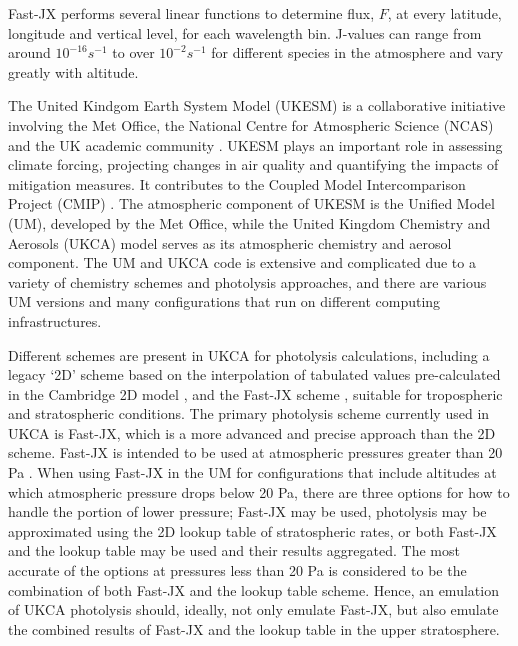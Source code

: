 \documentclass[journal abbreviation, manuscript]{copernicus}
\begin{document}
Fast-JX performs several linear functions to determine flux, $F$, at every latitude, longitude and vertical level, for each wavelength bin.
J-values can range from around $10^{-16} s^{-1}$ to over $10^{-2} s^{-1}$ for different species in the atmosphere and vary greatly with altitude.

The United Kindgom Earth System Model (UKESM) is a collaborative initiative involving the Met Office, the National Centre for Atmospheric Science (NCAS) and the UK academic community \citep{sellar_ukesm1_2019}. UKESM plays an important role in assessing climate forcing, projecting changes in air quality and quantifying the impacts of mitigation measures. It contributes to the Coupled Model Intercomparison Project (CMIP) \citep{eyring_overview_2016}. The atmospheric component of UKESM is the Unified Model (UM), developed by the Met Office, while the United Kingdom Chemistry and Aerosols (UKCA) model \citep{archibald_description_2020} serves as its atmospheric chemistry and aerosol component. The UM and UKCA code is extensive and complicated due to a variety of chemistry schemes and photolysis approaches, and there are various UM versions and many configurations that run on different computing infrastructures.

Different schemes are present in UKCA for photolysis calculations, including a legacy `2D' scheme based on the interpolation of tabulated values pre-calculated in the Cambridge 2D model \citep{abraham_united_2014}, and the Fast-JX scheme \citep{telford_implementation_2013}, suitable for tropospheric and stratospheric conditions. The primary photolysis scheme currently used in UKCA is Fast-JX, which is a more advanced and precise approach than the 2D scheme. %
Fast-JX is intended to be used at atmospheric pressures greater than 20 Pa \citep{wild_fast-j_2000}. When using Fast-JX in the UM for configurations that include altitudes at which atmospheric pressure drops below 20 Pa, there are three options for how to handle the portion of lower pressure; Fast-JX may be used, photolysis may be approximated using the 2D lookup table of stratospheric rates, or both Fast-JX and the lookup table may be used and their results aggregated.
The most accurate of the options at pressures less than 20 Pa is considered to be the combination of both Fast-JX and the lookup table scheme. Hence, an emulation of UKCA photolysis should, ideally, not only emulate Fast-JX, but also emulate the combined results of Fast-JX and the lookup table in the upper stratosphere.
\end{document}
